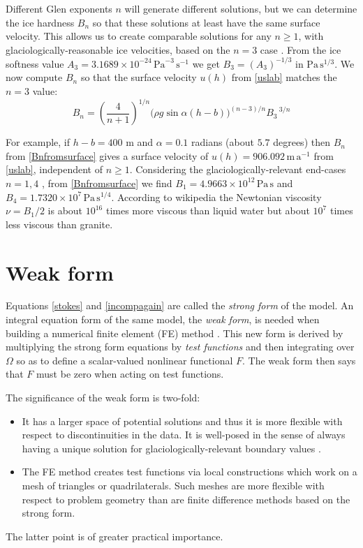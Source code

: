 \documentclass[letterpaper,final,12pt,reqno]{amsart}
\begin{document}
Different Glen exponents $n$ will generate different solutions, but we can determine the ice hardness $B_n$ so that these solutions at least have the same surface velocity.  This allows us to create comparable solutions for any $n\ge 1$, with glaciologically-reasonable ice velocities, based on the $n=3$ case \cite{GreveBlatter2009}.  From the ice softness value $A_3 = 3.1689 \times 10^{-24} \,\text{Pa}^{-3}\,\text{s}^{-1}$ we get $B_3 = (A_3)^{-1/3}$ in $\text{Pa}\,\text{s}^{1/3}$.  We now compute $B_n$ so that the surface velocity $u(h)$ from \eqref{uslab} matches the $n=3$ value:
\begin{equation}
B_n = \left(\frac{4}{n+1}\right)^{1/n} \Big(\rho g \sin\alpha (h-b)\Big)^{(n-3)/n} {B_3\,}^{3/n}  \label{Bnfromsurface}
\end{equation}

For example, if $h-b=400$ m and $\alpha=0.1$ radians (about $5.7$ degrees) then $B_n$ from \eqref{Bnfromsurface} gives a surface velocity of $u(h)=906.092 \,\text{m}\,\text{a}^{-1}$ from \eqref{uslab}, independent of $n\ge 1$.  Considering the glaciologically-relevant end-cases $n=1,4$ \cite{GoldsbyKohlstedt2001}, from \eqref{Bnfromsurface} we find $B_1=4.9663\times 10^{12}\,\text{Pa}\,\text{s}$ and $B_4=1.7320\times 10^{7}\,\text{Pa}\,\text{s}^{1/4}$.  According to wikipedia the Newtonian viscosity $\nu=B_1/2$ is about $10^{16}$ times more viscous than liquid water but about $10^7$ times less viscous than granite.


\section{Weak form} \label{sec:weakform}

Equations \eqref{stokes} and \eqref{incompagain} are called the \emph{strong form} of the model.  An integral equation form of the same model, the \emph{weak form}, is needed when building a numerical finite element (FE) method \cite{Elmanetal2014}.  This new form is derived by multiplying the strong form equations by \emph{test functions} and then integrating over $\Omega$ so as to define a scalar-valued nonlinear functional $F$.  The weak form then says that $F$ must be zero when acting on test functions.

The significance of the weak form is two-fold:
\begin{itemize}
\item It has a larger space of potential solutions and thus it is more flexible with respect to discontinuities in the data.  It is well-posed in the sense of always having a unique solution  for glaciologically-relevant boundary values \cite{JouvetRappaz2011}.
\item The FE method creates test functions via local constructions which work on a mesh of triangles or quadrilaterals.  Such meshes are more flexible with respect to problem geometry than are finite difference methods based on the strong form.
\end{itemize}
The latter point is of greater practical importance.
\end{document}

